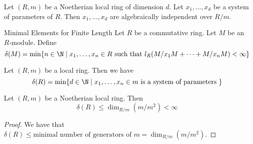 \documentclass[a4paper]{article}
\begin{document}
\begin{lmm}{}{} Let $(R,m)$ be a Noetherian local ring of dimension $d$. Let $x_1,\dots,x_d$ be a system of parameters of $R$. Then $x_1,\dots,x_d$ are algebraically independent over $R/m$. 
\end{lmm}

\begin{defn}{Minimal Elements for Finite Length}{} Let $R$ be a commutative ring. Let $M$ be an $R$-module. Define $$\delta(M)=\min\{n\in\N\;|\;x_1,\dots,x_n\in R\text{ such that }l_R(M/x_1M+\dots+M/x_nM)<\infty\}$$
\end{defn}

\begin{prp}{}{} Let $(R,m)$ be a local ring. Then we have $$\delta(R)=\min\{d\in\N\;|\;x_1,\dots,x_n\in m\text{ is a system of parameters }\}$$
\end{prp}

\begin{prp}{}{} Let $(R,m)$ be a Noetherian local ring. Then $$\delta(R)\leq\dim_{R/m}(m/m^2)<\infty$$ \tcbline
\begin{proof}
We have that $\delta(R)\leq\text{minimal number of generators of }m=\dim_{R/m}(m/m^2)$. 
\end{proof}
\end{prp}
\end{document}
